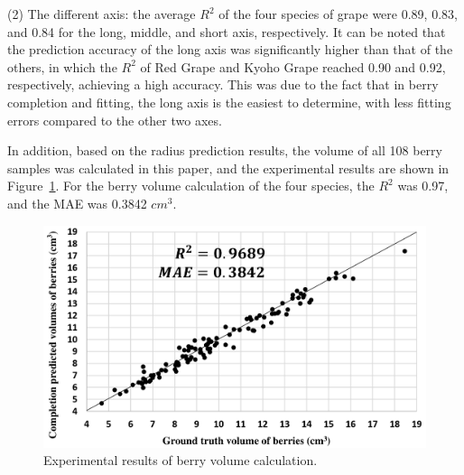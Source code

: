 \documentclass[12pt]{article}
\begin{document}
(2) The different axis: the average $R^2$ of the four species of grape were 0.89, 0.83, and 0.84 for the long, middle, and short axis, respectively. 
It can be noted that the prediction accuracy of the long axis was significantly higher than that of the others, in which the $R^2$ of Red Grape and Kyoho Grape reached 0.90 and 0.92, respectively, achieving a high accuracy. 
This was due to the fact that in berry completion and fitting, the long axis is the easiest to determine, with less fitting errors compared to the other two axes.

In addition, based on the radius prediction results, the volume of all 108 berry samples was calculated in this paper, and the experimental results are shown in Figure~\ref{fig:raw18}.
For the berry volume calculation of the four species, the $R^2$ was 0.97, and the MAE was 0.3842 $cm^3$.

\begin{figure}[hbt!]
    \centering
    \includegraphics[width=1\textwidth]{figures/Figure15.pdf}
    \caption{Experimental results of berry volume calculation. }
    \label{fig:raw18}
\end{figure}
\end{document}
